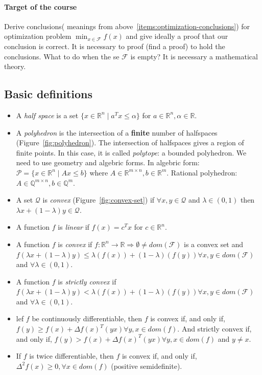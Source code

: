 \documentclass[main]{subfiles}
\begin{document}
\paragraph{Target of the course}
Derive conclusions( meanings from above~\ref{items:optimization-conclusions}) for optimization
problem $\displaystyle \min_{x \in \mathcal{F}} f(x)$ and give ideally a proof
that our conclusion is correct. It is necessary to proof (find a proof) to hold
the conclusions. What to do when the se $\mathcal{F}$ is empty? It is necessary
a mathematical theory.


\subsection{Basic definitions}
\begin{itemize}
\item A \emph{half space} is a set $\{ x \in \mathbb{R}^{n} \mid a^{T} x \leq
\alpha \}$ for $a \in \mathbb{R}^{n}, \alpha \in \mathbb{R}$.

\item A \emph{polyhedron} is the intersection of a \textbf{finite} number of
halfspaces (Figure~\ref{fig:polyhedron}). The intersection of halfspaces gives a
region of finite points. In this case, it is called \emph{polytope}: a bounded
polyhedron. We need to use geometry and algebric forms. In algebric form:
$\mathcal{P} = \{ x \in \mathbb{R}^{n} \mid Ax \leq b \}$ where $A \in
\mathbb{R}^{m \times n}, b \in \mathbb{R}^{m}$. Rational polyhedron: $A \in
\mathbb{Q}^{ m \times n}, b \in \mathbb{Q}^{m}$.

\item A set $\mathcal{Q}$ is \emph{convex} (Figure~\ref{fig:convex-set}) if
$\forall x, y \in \mathcal{Q}$ and $\lambda \in (0,1)$ then $\lambda x +
(1 - \lambda)y \in \mathcal{Q}$.

\item A function $f$ is \emph{linear} if $f(x) = c^{T}x$ for $c \in
\mathbb{R}^{n}$.

\item A function $f$ is \emph{convex} if $f: \mathbb{R}^{n} \rightarrow
\mathbb{R} \Rightarrow \emptyset \neq dom(\mathcal{F})$ is a convex set and
$f(\lambda x + (1-\lambda)y) \leq \lambda (f(x)) + (1-\lambda)(f(y)) \forall
x, y \in dom(\mathcal{F})$ and $\forall \lambda \in (0,1)$.

\item A function $f$ is \emph{strictly convex} if $f(\lambda x + (1-\lambda)y)
< \lambda (f(x)) + (1-\lambda)(f(y)) \forall x, y \in dom(\mathcal{F})$ and
$\forall \lambda \in (0,1)$.

\item lef $f$ be continuously differentiable, then $f$ is convex if, and only
if, $f(y) \geq f(x) + \Delta f(x)^{T}(yx) \forall y,x \in dom(f)$. And strictly
convex if, and only if, $f(y) > f(x) + \Delta f(x)^{T}(yx) \forall y,x \in
dom(f)$ and $y \neq x$.

\item If $f$ is twice differentiable, then $f$ is convex if, and only if,
$\Delta^{2} f(x) \geq 0, \forall x \in dom(f)$ (positive semidefinite).
\end{itemize}
\end{document}
